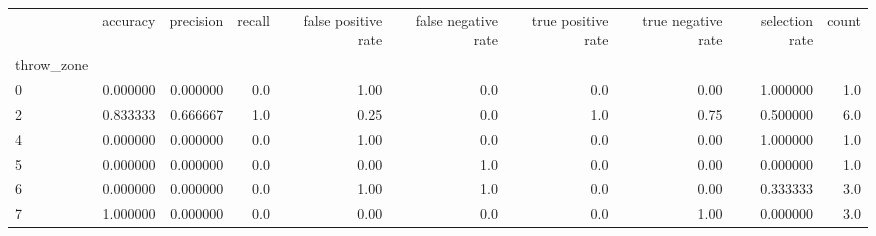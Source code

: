 \begin{tabular}{lrrrrrrrrr}
\toprule
{} &  accuracy &  precision &  recall &  false positive rate &  false negative rate &  true positive rate &  true negative rate &  selection rate &  count \\
throw\_zone &           &            &         &                      &                      &                     &                     &                 &        \\
\midrule
0          &  0.000000 &   0.000000 &     0.0 &                 1.00 &                  0.0 &                 0.0 &                0.00 &        1.000000 &    1.0 \\
2          &  0.833333 &   0.666667 &     1.0 &                 0.25 &                  0.0 &                 1.0 &                0.75 &        0.500000 &    6.0 \\
4          &  0.000000 &   0.000000 &     0.0 &                 1.00 &                  0.0 &                 0.0 &                0.00 &        1.000000 &    1.0 \\
5          &  0.000000 &   0.000000 &     0.0 &                 0.00 &                  1.0 &                 0.0 &                0.00 &        0.000000 &    1.0 \\
6          &  0.000000 &   0.000000 &     0.0 &                 1.00 &                  1.0 &                 0.0 &                0.00 &        0.333333 &    3.0 \\
7          &  1.000000 &   0.000000 &     0.0 &                 0.00 &                  0.0 &                 0.0 &                1.00 &        0.000000 &    3.0 \\
\bottomrule
\end{tabular}

